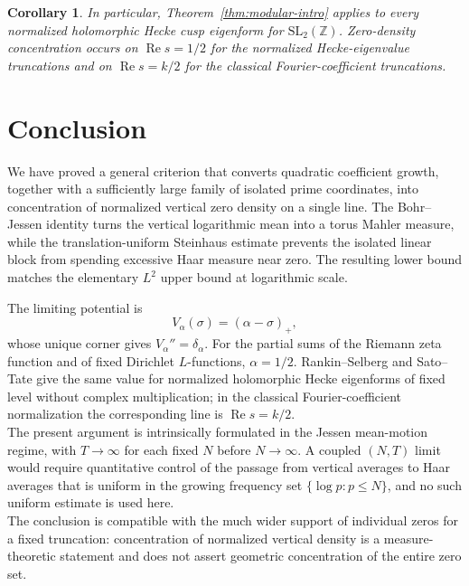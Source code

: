 \documentclass[11pt]{article}
\newtheorem{corollary}[theorem]{Corollary}
\theoremstyle{definition}
\newcommand{\Z}{\mathbb Z}
\newcommand{\Ree}{\operatorname{Re}}
\newcommand{\1}{\mathbf 1}
\begin{document}
\begin{corollary}\label{cor:level-one}
In particular, Theorem~\ref{thm:modular-intro} applies to every normalized holomorphic Hecke cusp eigenform for $\mathrm{SL}_2(\Z)$.  Zero-density concentration occurs on $\Ree s=1/2$ for the normalized Hecke-eigenvalue truncations and on $\Ree s=k/2$ for the classical Fourier-coefficient truncations.
\end{corollary}

\section{Conclusion}

We have proved a general criterion that converts quadratic coefficient growth, together with a sufficiently large family of isolated prime coordinates, into concentration of normalized vertical zero density on a single line.  The Bohr--Jessen identity turns the vertical logarithmic mean into a torus Mahler measure, while the translation-uniform Steinhaus estimate prevents the isolated linear block from spending excessive Haar measure near zero.  The resulting lower bound matches the elementary $L^2$ upper bound at logarithmic scale.

The limiting potential is
\[
V_\alpha(\sigma)=(\alpha-\sigma)_+,
\]
whose unique corner gives $V_\alpha''=\delta_\alpha$.  For the partial sums of the Riemann zeta function and of fixed Dirichlet $L$-functions, $\alpha=1/2$.  Rankin--Selberg and Sato--Tate give the same value for normalized holomorphic Hecke eigenforms of fixed level without complex multiplication; in the classical Fourier-coefficient normalization the corresponding line is $\Ree s=k/2$.\\
The present argument is intrinsically formulated in the Jessen
mean-motion regime, with $T\to\infty$ for each fixed $N$ before
$N\to\infty$.  A coupled $(N,T)$ limit would require quantitative
control of the passage from vertical averages to Haar averages that
is uniform in the growing frequency set
$\{\log p:p\le N\}$, and no such uniform estimate is used here.\\

The conclusion is compatible with the much wider support of individual zeros for a fixed truncation: concentration of normalized vertical density is a measure-theoretic statement and does not assert geometric concentration of the entire zero set.
\end{document}
